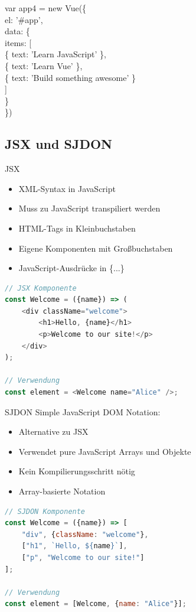 var app4 = new Vue(\{\\
el: '\#app',\\
data: \{\\
items: [\\
\{ text: 'Learn JavaScript' \},\\
\{ text: 'Learn Vue' \},\\
\{ text: 'Build something awesome' \}\\[0pt]
]\\
\}\\
\})

\subsection{JSX und SJDON}

\begin{definition}{JSX}
    \begin{itemize}
        \item XML-Syntax in JavaScript
        \item Muss zu JavaScript transpiliert werden
        \item HTML-Tags in Kleinbuchstaben
        \item Eigene Komponenten mit Großbuchstaben
        \item JavaScript-Ausdrücke in \{...\}
    \end{itemize}
\begin{lstlisting}[language=JavaScript, style=basesmol]
// JSX Komponente
const Welcome = ({name}) => (
    <div className="welcome">
        <h1>Hello, {name}</h1>
        <p>Welcome to our site!</p>
    </div>
);

// Verwendung
const element = <Welcome name="Alice" />;
\end{lstlisting}
\end{definition}

\begin{definition}{SJDON}
    Simple JavaScript DOM Notation:
    \begin{itemize}
        \item Alternative zu JSX
        \item Verwendet pure JavaScript Arrays und Objekte
        \item Kein Kompilierungsschritt nötig
        \item Array-basierte Notation
    \end{itemize}
\begin{lstlisting}[language=JavaScript, style=basesmol]
// SJDON Komponente
const Welcome = ({name}) => [
    "div", {className: "welcome"},
    ["h1", `Hello, ${name}`],
    ["p", "Welcome to our site!"]
];

// Verwendung
const element = [Welcome, {name: "Alice"}];
\end{lstlisting}
\end{definition}

